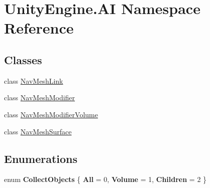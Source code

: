 \hypertarget{namespace_unity_engine_1_1_a_i}{}\section{Unity\+Engine.\+AI Namespace Reference}
\label{namespace_unity_engine_1_1_a_i}
\subsection*{Classes}
\begin{DoxyCompactItemize}
\item 
class \mbox{\hyperlink{class_unity_engine_1_1_a_i_1_1_nav_mesh_link}{Nav\+Mesh\+Link}}
\item 
class \mbox{\hyperlink{class_unity_engine_1_1_a_i_1_1_nav_mesh_modifier}{Nav\+Mesh\+Modifier}}
\item 
class \mbox{\hyperlink{class_unity_engine_1_1_a_i_1_1_nav_mesh_modifier_volume}{Nav\+Mesh\+Modifier\+Volume}}
\item 
class \mbox{\hyperlink{class_unity_engine_1_1_a_i_1_1_nav_mesh_surface}{Nav\+Mesh\+Surface}}
\end{DoxyCompactItemize}
\subsection*{Enumerations}
\begin{DoxyCompactItemize}
\item 
\mbox{\label{namespace_unity_engine_1_1_a_i_ab3439844eec641152f2ba65fb19b5cf9}} 
enum {\bfseries Collect\+Objects} \{ {\bfseries All} = 0, 
{\bfseries Volume} = 1, 
{\bfseries Children} = 2
 \}
\end{DoxyCompactItemize}
